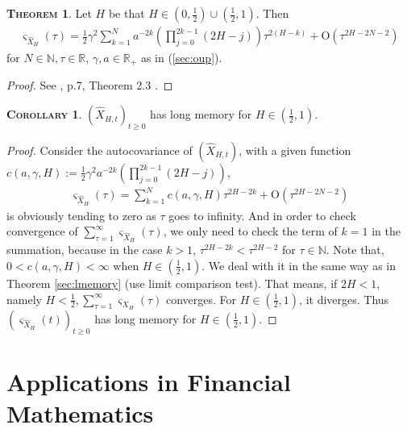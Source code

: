 \documentclass[a4paper, twoside, 11pt]{article}
\theoremstyle{definition}
\newtheorem{theorem}[definition]{\scshape Theorem}
\newtheorem{corollary}[definition]{\scshape Corollary}
\newcommand{\brkt}[1]{\left({#1} \right)}
\begin{document}
\begin{theorem}
  Let $H$ be that $H\in (0, \frac{1}{2}) \cup (\frac{1}{2}, 1)$. Then
  \begin{eqnarray*}
	\varsigma_{\hat{X}_{H}}(\tau) = \frac{1}{2} \gamma^2 \sum_{k=1}^{N} a^{-2k}\brkt{\prod_{j=0}^{2k-1}(2H-j)}\tau^{2(H-k)} + \mathrm{O}(\tau^{2H-2N-2})
\end{eqnarray*}
for $N \in \mathbb{N}, \tau\in\mathbb{R}$, $\gamma, a \in \mathbb{R}_+$ as in (\ref{sec:oup}).
  \label{sec:autocov}
\end{theorem}
\begin{proof}
  See \cite{chriel}, p.7, Theorem 2.3 .
\end{proof}

\begin{corollary}
  $(\hat{X}_{H,t})_{t\ge 0}$ has long memory for $H\in (\frac{1}{2}, 1)$.
  \label{sec:longmer}
\end{corollary}
\begin{proof}
  Consider the autocovariance of $(\hat{X}_{H,t})$, with a given function \\$c(a, \gamma, H):= \frac{1}{2} \gamma^2 a^{-2k}\brkt{\prod_{j=0}^{2k-1}(2H-j)}$,
  \begin{eqnarray*}
	\varsigma_{\hat{X}_{H}}(\tau) = \sum_{k=1}^N c(a, \gamma,  H) \tau^{2H-2k} + \mathrm{O}(\tau^{{2H-2N-2}})
  \end{eqnarray*}
  is obviously tending to zero as $\tau$ goes to infinity. And in order to check convergence of $\sum_{\tau=1}^{\infty} \varsigma_{\hat{X}_{H}}(\tau)$, we only need to check the term of $k=1$ in the summation, because in the case $k>1$, $\tau^{2H-2k} < \tau^{2H-2}$ for $\tau\in\mathbb{N}$. Note that, $0 <c(a, \gamma, H) < \infty$ when $H\in(\frac{1}{2}, 1)$. We deal with it in the same way as in Theorem \ref{sec:lmemory} (use limit comparison test). That means, if $2H < 1$, namely $H<\frac{1}{2}, \sum_{\tau=1}^{\infty} \varsigma_{X_{H}}(\tau)$ converges. For $H\in (\frac{1}{2}, 1)$, it diverges. Thus $(\varsigma_{\hat{X}_{H}}(t))_{t\ge 0}$ has long memory for $H\in(\frac{1}{2}, 1)$.
\end{proof}
\newpage

\section{Applications in Financial Mathematics}
\setcounter{equation}{0}
\end{document}
